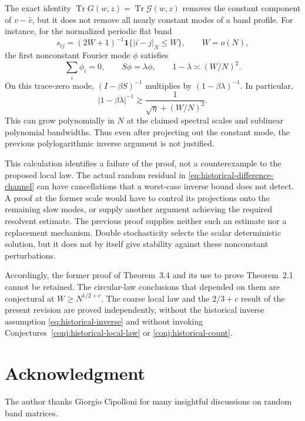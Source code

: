\documentclass[11pt,reqno]{amsart}
\numberwithin{equation}{section}
\theoremstyle{plain}
\theoremstyle{definition}
\theoremstyle{remark}
\begin{document}
The exact identity
\(\operatorname{Tr}G(w,z)=\operatorname{Tr}\mathcal G(w,z)\)
removes the constant component of \(v-\widehat v\), but it does not
remove all nearly constant modes of a band profile.  For instance, for
the normalized periodic flat band
\[
 s_{ij}=(2W+1)^{-1}\mathbf1\{|i-j|_N\leq W\},\qquad W=o(N),
\]
the first nonconstant Fourier mode \(\phi\) satisfies
\[
 \sum_i\phi_i=0,\qquad S\phi=\lambda\phi,
 \qquad 1-\lambda\asymp(W/N)^2.
\]
On this trace-zero mode, \((I-\beta S)^{-1}\) multiplies by
\((1-\beta\lambda)^{-1}\).  In particular,
\begin{equation}
 |1-\beta\lambda|^{-1}
 \gtrsim\frac1{\sqrt\eta+(W/N)^2}.
 \label{eq:historical-slow-mode}
\end{equation}
This can grow polynomially in \(N\) at the claimed spectral scales
and sublinear polynomial bandwidths.  Thus even after projecting out
the constant mode, the previous polylogarithmic inverse argument is
not justified.

This calculation identifies a failure of the proof, not a
counterexample to the proposed local law.  The actual random residual
in \eqref{eq:historical-difference-channel} can have cancellations
that a worst-case inverse bound does not detect.  A proof at the
former scale would have to control its projections onto the remaining
slow modes, or supply another argument achieving the required
resolvent estimate.  The previous proof supplies neither such an
estimate nor a replacement mechanism.  Double stochasticity selects
the scalar deterministic solution, but it does not by itself give
stability against these nonconstant perturbations.

Accordingly, the former proof of Theorem~3.4 and its use to prove
Theorem~2.1 cannot be retained.  The circular-law conclusions that
depended on them are conjectural at \(W\geq N^{1/2+c}\).
The coarse local law and the \(2/3+c\) result of the present revision
are proved independently, without the historical inverse assumption
\eqref{eq:historical-inverse} and without invoking
Conjectures~\ref{conj:historical-local-law} or
\ref{conj:historical-count}.


\section*{Acknowledgment}
The author thanks Giorgio Cipolloni for many insightful discussions on random band matrices.
\end{document}
